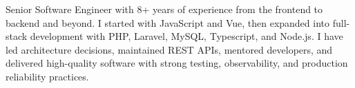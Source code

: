 

\begin{cvparagraph}
    Senior Software Engineer with 8+ years of experience from the frontend to backend and beyond. I started with JavaScript and Vue, then expanded into full-stack development with PHP, Laravel, MySQL, Typescript, and Node.js. I have led architecture decisions, maintained REST APIs, mentored developers, and delivered high-quality software with strong testing, observability, and production reliability practices.
\end{cvparagraph}
